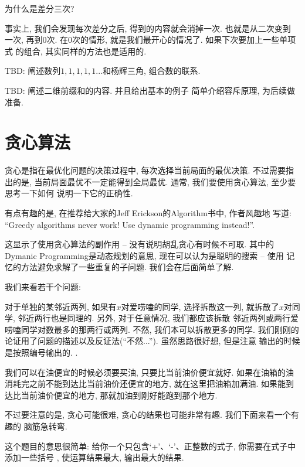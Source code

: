 \begin{ques}
    为什么是差分三次?
\end{ques}

事实上, 我们会发现每次差分之后, 得到的内容就会消掉一次. 也就是从二次变到
一次, 再到0次. 在0次的情形, 就是我们最开心的情况了. 如果下次要加上一些单项式
的组合, 其实同样的方法也是适用的. 

 TBD: 阐述数列$1,1,1,1,1...$和杨辉三角, 组合数的联系.

 TBD: 阐述二维前缀和的内容. 并且给出基本的例子
简单介绍容斥原理, 为后续做准备. 

\section{贪心算法}

贪心是指在最优化问题的决策过程中, 每次选择当前局面的最优决策. 不过需要指出的是, 
当前局面最优不一定能得到全局最优. 通常, 我们要使用贪心算法, 至少要思考一下如何
说明一下它的正确性. 

\begin{remark}
    有点有趣的是, 在推荐给大家的Jeff Erickson的Algorithm书中, 作者风趣地
    写道: ``Greedy algorithms never work! Use dynamic programming instead!''.

    这显示了使用贪心算法的副作用 -- 没有说明胡乱贪心有时候不可取. 其中的 
    Dymanic Programming是动态规划的意思, 现在可以认为是聪明的搜索 -- 使用
    记忆的方法避免求解了一些重复的子问题. 我们会在后面简单了解. 
\end{remark}

我们来看若干个问题: 

 对于单独的某邻近两列, 如果有$x$对爱唠嗑的同学, 选择拆散这一列, 
就拆散了$x$对同学, 邻近两行也是同理的. 另外, 对于任意情况, 我们都应该拆散
邻近两列或两行爱唠嗑同学对数最多的那两行或两列. 不然, 我们本可以拆散更多的同学. 
我们刚刚的论证用了问题的描述以及反证法(``不然...''). 虽然思路很好想, 但是注意
输出的时候是按照编号输出的. . 

 我们可以在油便宜的时候必须要买油, 只要比当前油价便宜就好. 
如果在油箱的油消耗完之前不能到达比当前油价还便宜的地方, 就在这里把油箱加满油. 
如果能到达比当前油价便宜的地方, 那就加油到刚好能跑到那个地方. 



不过要注意的是, 贪心可能很难, 贪心的结果也可能非常有趣. 我们下面来看一个有趣的
脑筋急转弯. 

这个题目的意思很简单: 给你一个只包含`+'、`-'、正整数的式子, 你需要在式子中添加一些括号
, 使运算结果最大, 输出最大的结果. 

